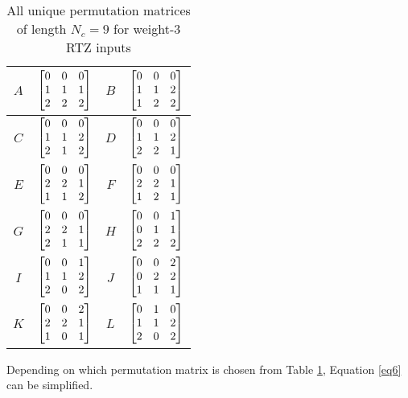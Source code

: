 \documentclass[11pt, oneside, dvipdfmx]{book}
\begin{document}
\begin{table}[h!]
\centering
\begin{tabular}{|c || c  |c  ||c  |} 
 \hline
 $A$ & $\begin{bmatrix} 0 & 0 & 0 \cr 1 & 1 & 1 \cr 2 & 2 & 2\end{bmatrix}$ 
  &
 $B$ & $\begin{bmatrix}0 & 0 & 0 \cr 1 & 1 & 2 \cr 1 & 2 & 2\end{bmatrix}$\\ 
 \hline
$C$ & $\begin{bmatrix}0 & 0 & 0 \cr 1 & 1 & 2 \cr 2 & 1 & 2\end{bmatrix}$ 
 &
$D$ & $\begin{bmatrix}0 & 0 & 0 \cr 1 & 1 & 2 \cr 2 & 2 & 1\end{bmatrix}$\\ 
 \hline
 $E$ & $\begin{bmatrix}0 & 0 & 0 \cr 2 & 2 & 1 \cr 1 & 1 & 2\end{bmatrix}$ 
 &
 $F$ & $\begin{bmatrix}0 & 0 & 0 \cr 2 & 2 & 1 \cr 1 & 2 & 1\end{bmatrix}$\\ 
 \hline
 $G$ & $\begin{bmatrix}0 & 0 & 0 \cr 2 & 2 & 1 \cr 2 & 1 & 1\end{bmatrix}$ 
 &
  $H$ & $\begin{bmatrix}0 & 0 & 1 \cr 0 & 1 & 1 \cr 2 & 2 & 2\end{bmatrix}$\\ 
 \hline
  $I$ & $\begin{bmatrix}0 & 0 & 1 \cr 1 & 1 & 2 \cr 2 & 0 & 2\end{bmatrix}$ 
 &
 $J$ & $\begin{bmatrix}0 & 0 & 2 \cr 0 & 2 & 2 \cr 1 & 1 & 1\end{bmatrix}$\\ 
 \hline
  $K$ & $\begin{bmatrix}0 & 0 & 2 \cr 2 & 2 & 1 \cr 1 & 0 & 1\end{bmatrix}$
 &
  $L$ & $\begin{bmatrix}0 & 1 & 0 \cr 1 & 1 & 2 \cr 2 & 0 & 2\end{bmatrix}$\\ 
 \hline
\end{tabular}
\caption{All unique permutation matrices of length $N_c =9$ for weight-$3$ RTZ inputs}
\label{tb2}
\end{table}

Depending on which permutation matrix is chosen from Table \ref{tb2}, Equation \ref{eq6} can be simplified. 
\end{document}
